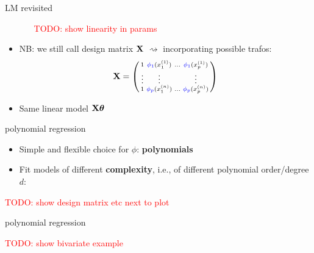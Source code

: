 \documentclass[11pt,compress,t,notes=noshow, xcolor=table]{beamer}
\begin{document}
\begin{vbframe}{LM revisited}
\begin{itemize}
\begin{itemize}
    \textcolor{red}{TODO: show linearity in params}
  \end{itemize}
  \item NB: we still call design matrix $\mathbf{X}$ $\rightsquigarrow$ 
    incorporating possible trafos:
    \begin{align*}
      \mathbf{X} = 
      \left(
        \begin{smallmatrix}
            1 & \textcolor{blue}{\phi_1} (x^{(1)}_1) & \ldots & 
            \textcolor{blue}{\phi_1} (x^{(1)}_p) \\
            \vdots & \vdots & & \vdots \\
            1 & \textcolor{blue}{\phi_p} (x^{(n)}_1) & \ldots & 
            \textcolor{blue}{\phi_p} (x^{(n)}_p) \\
        \end{smallmatrix}
        \right)
    \end{align*}
    \item Same linear model $\mathbf{X} \bm{\theta}$
\end{itemize}

\end{vbframe}


\begin{frame}{polynomial regression}

\begin{itemize}
    \item Simple and flexible choice for $\phi$: \textbf{polynomials}
    \item Fit models of different \textbf{complexity}, i.e., of different
    polynomial order/degree $d$:
\end{itemize}


\textcolor{red}{TODO: show design matrix etc next 
to plot}

\end{frame}


\begin{frame}{polynomial regression}

\textcolor{red}{TODO: show bivariate example}

\end{frame}
\end{document}
